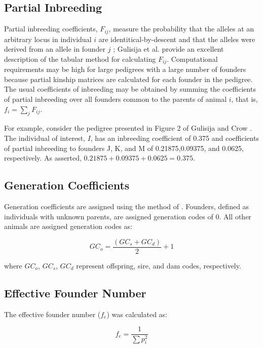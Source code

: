 \subsection{Partial Inbreeding}
\label{sec:methodology-partial-inbreeding}
Partial inbreeding coefficients, $F_{ij}$, measure the probability that the alleles at an arbitrary locus in individual $i$ are identitical-by-descent and that the alleles were derived from an allele in founder $j$ \cite{LacyAW1996}; Gulisija et al. \citeyear{GulisijaGWT2006} provide an excellent description of the tabular method for calculating $F_{ij}$. Computational requirements may be high for large pedigrees with a large number of founders because partial kinship matrices are calculated for each founder in the pedigree. The usual coefficients of inbreeding may be obtained by summing the coefficients of partial inbreeding over all founders common to the parents of animal $i$, that is, $f_{i} = \sum_{j} F_{ij}$.

For example, consider the pedigree presented in Figure 2 of Gulisija and Crow \citeyear {GulisijaC2007}. The individual of interest, $I$, has an inbreeding coefficient of 0.375 and coefficients of partial inbreeding to founders J, K, and M of 0.21875,0.09375, and 0.0625, respectively. As asserted, $0.21875 + 0.09375 + 0.0625 = 0.375$.
\subsection{Generation Coefficients}
\label{sec:methodology-computation-generation-coefficients}
Generation coefficients are assigned using the method of \cite{Pattie1965}.  Founders, defined as individuals with unknown parents, are assigned generation codes of 0. All other animals are assigned generation codes as:

\[ GC_o = \dfrac{ ( GC_s + GC_d ) } { 2 } + 1 \]

where $GC_o$, $GC_s$, $GC_d$ represent offspring, sire, and dam codes, respectively.
\subsection{Effective Founder Number}
\label{sec:methodology-computation-effective-founder-number}
The effective founder number ($f_e$) was calculated as:

\[ f_e = \dfrac{ 1 } { \sum{ p_i^2 } } \]

